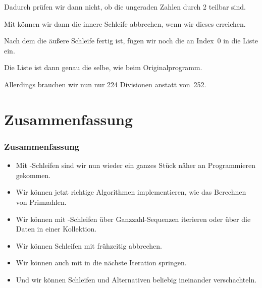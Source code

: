 \documentclass[aspectratio=169,mathserif,notheorems]{beamer}%
\begin{document}
\begin{frame}[t]
{{\begin{itemize}
{\item<15-> Dadurch prüfen wir dann nicht, ob die ungeraden Zahlen  durch 2 teilbar sind.%
}%
%
%
%
%
%
\item<20-> Mit  können wir dann die innere Schleife abbrechen, wenn wir dieses  erreichen.%
%
\item<21-> Nach dem die äußere Schleife fertig ist, fügen wir noch die  an Index~0 in die Liste ein.%
%
\item<22-> Die Liste ist dann genau die selbe, wie beim Originalprogramm.%
%
\item<23-> Allerdings brauchen wir nun nur 224 Divisionen anstatt von~252.
\end{itemize}%
}}%
%
%
%
%
%
\end{frame}%
%
\section{Zusammenfassung}%
%
\begin{frame}%
\frametitle{Zusammenfassung}%
\begin{itemize}%
\item Mit -Schleifen sind wir nun wieder ein ganzes Stück näher an  Programmieren gekommen.%
%
\item<2-> Wir können jetzt richtige Algorithmen implementieren, wie das Berechnen von Primzahlen.%
%
\item<3-> Wir können mit -Schleifen über Ganzzahl-Sequenzen iterieren oder über die Daten in einer Kollektion.%
%
\item<4-> Wir können Schleifen mit  frühzeitig abbrechen.%
%
\item<5-> Wir können auch mit  in die nächste Iteration springen.%
%
\item<6-> Und wir können Schleifen und Alternativen beliebig ineinander verschachteln.%
\end{itemize}%
\end{frame}%
%
\endPresentation%
\end{document}
